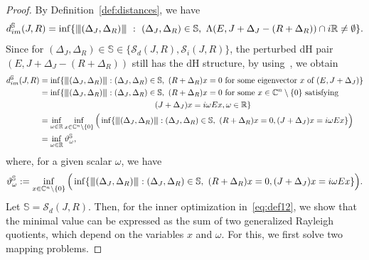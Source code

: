 \documentclass[11pt]{article}
\newcommand{\R}{\mathbb R}
\newcommand{\C}{\mathbb C}
\newcommand{\nnrm}[1]{{\left\vert\kern-0.25ex\left\vert\kern-0.25ex\left\vert #1
		\right\vert\kern-0.25ex\right\vert\kern-0.25ex\right\vert}}
\begin{document}
\begin{proof}
	By Definition~\ref{def:distances}, we have
	\begin{align*}
		d_{im}^{\mathbb S}(J,R)=\inf \{ \nnrm{(\Delta_J,\Delta_R)}~:~(\Delta_J,\Delta_R)\in\mathbb S,~\Lambda(E,J+\Delta_J - (R+\Delta_R)) \cap i\R \neq \emptyset \}.
	\end{align*}
	Since for $(\Delta_J,\Delta_R)\in \mathbb S\in \{\mathcal S_d(J,R),\mathcal S_i(J,R)\}$, the perturbed dH pair $(E,J+\Delta_J - (R+\Delta_R))$ still has the dH structure, by using~\cite[Lemma 4.1]{MehMS16}, we obtain
	\begin{align}%
		d_{im}^{\mathbb S}(J,R)
		&=\inf \{ \nnrm{(\Delta_J,\Delta_R)}:(\Delta_J,\Delta_R)\in\mathbb S,~(R+\Delta_R)x=0 \text{ for some eigenvector $x$ of } (E,J+\Delta_J) \}\nonumber\\
		&=\inf\{ \nnrm{(\Delta_J,\Delta_R)}:(\Delta_J,\Delta_R)\in\mathbb S,~ (R+\Delta_R)x=0 \text{ for some $x\in \C^n\setminus\{0\}$ satisfying } \nonumber\\ &\hspace{5cm}  (J+\Delta_J)x= i\omega E x, \omega\in \R\}\nonumber\\
		&= \inf_{\omega\in \R}\inf_{x\in\C^{n}\setminus \{0\}} \Big(\inf \{ \nnrm{(\Delta_J,\Delta_R)}:(\Delta_J,\Delta_R)\in\mathbb S,~ (R+\Delta_R)x=0, (J+\Delta_J)x= i\omega E x\} \Big)\nonumber\\
		&=\inf_{\omega \in \R } \vartheta^{\mathbb S}_{\omega} \label{eq:def11},
	\end{align}
	where, for a given scalar $\omega$, we have
	\begin{align}\label{eq:def12}
		\vartheta^{\mathbb S}_{\omega}:= \inf_{x\in\C^{n}\setminus \{0\}} \Big(\inf \{ \nnrm{(\Delta_J,\Delta_R)}:(\Delta_J,\Delta_R)\in\mathbb S,~ (R+\Delta_R)x=0,(J+\Delta_J)x= i\omega E x\} \Big).
	\end{align}
	Let $\mathbb S=\mathcal S_d(J,R)$. Then, for the inner optimization in~\eqref{eq:def12}, we show that the minimal value can be expressed as the sum of two generalized Rayleigh quotients, which depend on the variables $x$ and $\omega$. For this, we first solve two mapping problems.


\end{proof}
\end{document}
